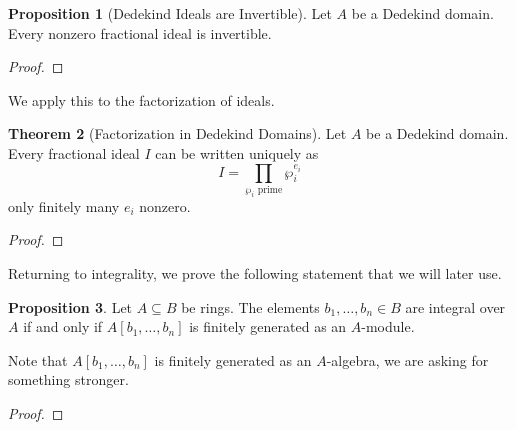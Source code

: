 \documentclass{amsart}
\theoremstyle{definition}
\newtheorem{theorem}{Theorem}[section]
\newtheorem{proposition}[theorem]{Proposition}
\numberwithin{equation}{section}
\begin{document}
\begin{proposition}[Dedekind Ideals are Invertible]
  Let $A$ be a Dedekind domain. Every nonzero fractional ideal is invertible. 
\end{proposition}
\begin{proof}
  
\end{proof}
We apply this to the factorization of ideals. 
\begin{theorem}[Factorization in Dedekind Domains]
  Let $A$ be a Dedekind domain. Every fractional ideal $I$ can be written uniquely as 
  $$I=\prod_{\wp_{i}\text{ prime}}\wp_{i}^{e_{i}}$$
  only finitely many $e_{i}$ nonzero. 
\end{theorem}
\begin{proof}
  
\end{proof}
Returning to integrality, we prove the following statement that we will later use. 
\begin{proposition}
  Let $A\subseteq B$ be rings. The elements $b_{1},\dots,b_{n}\in B$ are integral over $A$ if and only if $A[b_{1},\dots,b_{n}]$ is finitely generated as an $A$-module. 
\end{proposition}
Note that $A[b_{1},\dots,b_{n}]$ is finitely generated as an $A$-algebra, we are asking for something stronger. 
\begin{proof}
  
\end{proof}
\newpage
\printbibliography
\end{document}
